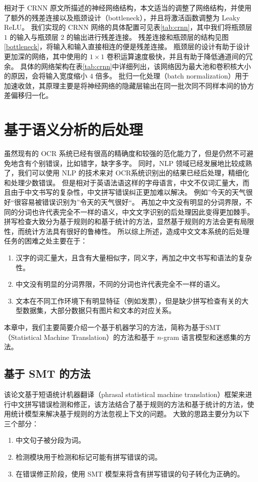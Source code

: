 相对于 CRNN 原文所描述的神经网络结构，本文适当的调整了网络结构，并使用了额外的残差连接以及瓶颈设计（bottleneck）\cite{ResNet}，并且将激活函数调整为 Leaky ReLU\cite{leaky_relu}。
我们实现的 CRNN 网络的具体配置可见表\ref{tab:crnn}，其中我们将瓶颈层 $1$ 的输入与瓶颈层 $2$ 的输出进行残差连接。
残差连接和瓶颈层的结构见图\ref{bottleneck}，将输入和输入直接相连的便是残差连接。
瓶颈层的设计有助于设计更加深的网络，其中使用的 $1 \times 1$ 卷积运算速度极快，并且有助于降低通道间的冗余。
具体的网络架构在表\ref{tab:crnn}中详细列出，该网络因为最大池和卷积核大小的原因，会将输入宽度缩小 $4$ 倍多。
批归一化处理（batch normalization）\cite{batch_norm}用于加速收敛，其原理主要是将神经网络的隐藏层输出在同一批次同不同样本间的协方差偏移归一化。

\section{基于语义分析的后处理}
虽然现有的 OCR 系统已经有很高的精确度和较强的范化能力了，但是仍然不可避免地含有个别错误，比如错字，缺字多字。
同时，NLP 领域已经发展地比较成熟了，我们可以使用 NLP 的技术来对 OCR系统识别出的结果已经后处理，精细化和处理少数错误。
但是相对于英语法语这样的字母语言，中文不仅词汇量大，而且由于中文书写的复杂性，中文拼写错误纠正更加难以解决。
例如”今天的天气很好“很容易被错误识别为”令天的天气很好“。
再加之中文没有明显的分词界限，不同的分词也许代表完全不一样的语义，中文文字识别的后处理因此变得更加棘手。
拼写检查大致分为基于规则的和基于统计的方法，显然基于规则的方法会更有局限性，而统计方法具有很好的鲁棒性。
所以综上所述，造成中文文本系统的后处理任务的困难之处主要在于：
\begin{enumerate}[(1)]
	\item 汉字的词汇量大，且含有大量相似字，同义字，再加之中文书写和语法的复杂性。
	\item 中文没有明显的分词界限，不同的分词也许代表完全不一样的语义。
	\item 文本在不同工作环境下有明显特征（例如发票），但是缺少拼写检查有关的大型数据集，大部分数据只有图片和文本的对应关系。
\end{enumerate}

本章中，我们主要简要介绍一个基于机器学习的方法，简称为基于SMT（Statistical Machine Translation）的方法\cite{post_SMT}和基于 $n$-gram 语言模型和迷惑集的方法\cite{huang2014chinese,mei2016statistical}。

\subsection{基于 SMT 的方法}
该论文基于短语统计机器翻译（phrasal statistical machine translation）框架来进行中文拼写错误检测和修正，该方法结合了基于规则的方法和基于统计的方法，使用统计模型来解决基于规则的方法忽视上下文的问题。
大致的思路主要分为以下三个部分：
\begin{enumerate}[(1)]
	\item 中文句子被分段为词。
	\item 检测模块用于检测和标记可能有拼写错误的词。
	\item 在错误修正阶段，使用 SMT 模型来将含有拼写错误的句子转化为正确的。
\end{enumerate}

